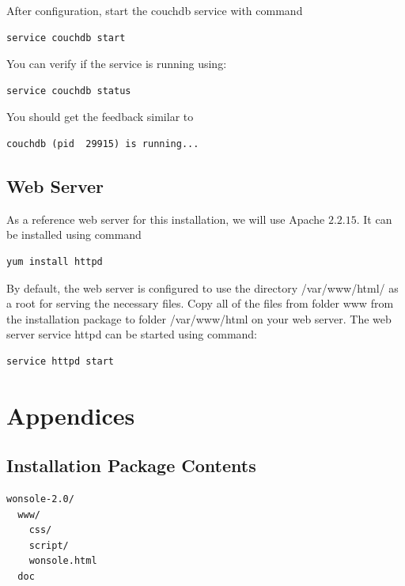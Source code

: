 \documentclass[10pt,a4paper,oneside]{report}
\begin{document}
After configuration, start the couchdb service with command
\begin{verbatim}
service couchdb start
\end{verbatim}
You can verify if the service is running using:
\begin{verbatim}
service couchdb status
\end{verbatim}
You should get the feedback similar to
\begin{verbatim}
couchdb (pid  29915) is running...
\end{verbatim}
\section{Web Server}
As a reference web server for this installation, we will use Apache $2.2.15$. It
can be installed using command
\begin{verbatim}
yum install httpd
\end{verbatim}
By default, the web server is configured to use the directory /var/www/html/ as
a root for serving the necessary files. Copy all of the files from folder www from
the installation package to folder /var/www/html on your web server.
The web server service httpd can be started using command:
\begin{verbatim}
service httpd start
\end{verbatim}



\chapter{Appendices}
\section{Installation Package Contents}
\begin{verbatim}
wonsole-2.0/
  www/
    css/
    script/
    wonsole.html
  doc
\end{verbatim}
\end{document}
